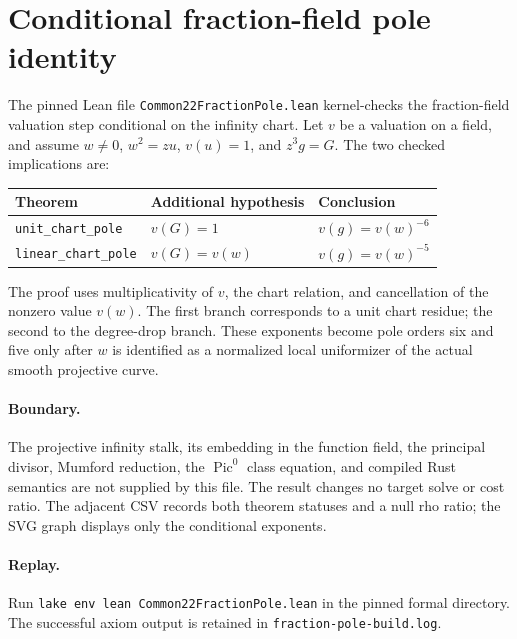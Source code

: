 \documentclass[10pt]{article}
\begin{document}
\section*{Conditional fraction-field pole identity}
The pinned Lean file \texttt{Common22FractionPole.lean} kernel-checks the
fraction-field valuation step conditional on the infinity chart.  Let $v$
be a valuation on a field, and assume $w\ne0$, $w^2=zu$, $v(u)=1$, and
$z^3g=G$. The two checked implications are:
\begin{center}
\begin{tabular}{lll}\toprule
Theorem & Additional hypothesis & Conclusion\\\midrule
\texttt{unit\_chart\_pole} & $v(G)=1$ & $v(g)=v(w)^{-6}$\\
\texttt{linear\_chart\_pole} & $v(G)=v(w)$ & $v(g)=v(w)^{-5}$\\\bottomrule
\end{tabular}
\end{center}
The proof uses multiplicativity of $v$, the chart relation, and cancellation
of the nonzero value $v(w)$. The first branch corresponds to a unit chart
residue; the second to the degree-drop branch. These exponents become pole
orders six and five only after $w$ is identified as a normalized local
uniformizer of the actual smooth projective curve.

\paragraph{Boundary.} The projective infinity stalk, its embedding in the
function field, the principal divisor, Mumford reduction, the $\operatorname{Pic}^0$
class equation, and compiled Rust semantics are not supplied by this file.
The result changes no target solve or cost ratio. The adjacent CSV records
both theorem statuses and a null rho ratio; the SVG graph displays only
the conditional exponents.

\paragraph{Replay.} Run \texttt{lake env lean Common22FractionPole.lean} in
the pinned formal directory. The successful axiom output is retained in
\texttt{fraction-pole-build.log}.
\end{document}

